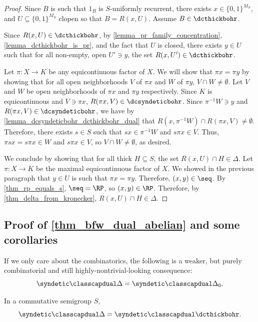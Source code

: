 \begin{proof}
    Since $B$ is such that $1_B$ is $S$-uniformly recurrent, there exists $x \in \{0,1\}^{M_S}$, and $U \subseteq \{0,1\}^{M_S}$ clopen so that $B = R(x,U)$.  Assume $B \in \dcthickbohr$.

    Since $R(x,U) \in \dcthickbohr$, by \cref{lemma_pr_family_concentration}, \cref{lemma_dcthickbohr_is_pr}, and the fact that $U$ is closed, there exists $y \in U$ such that for all non-empty, open $U' \ni y$, the set $R(x,U') \in \dcthickbohr$.
    
    Let $\pi: X \to K$ be any equicontinuous factor of $X$.  We will show that $\pi x = \pi y$ by showing that for all open neighborhoods $V$ of $\pi x$ and $W$ of $\pi y$, $V \cap W \neq \emptyset$.  Let $V$ and $W$ be open neighborhoods of $\pi x$ and $\pi y$ respectively.  Since $K$ is equicontinuous and $V \ni \pi x$, $R(\pi x, V) \in \dcsyndeticbohr$. Since $\pi^{-1} W \ni y$ and $R(\pi x, V) \in \dcsyndeticbohr$, we have by \cref{lemma_dcsyndeticbohr_dcthickbohr_dual} that $R(x,\pi^{-1} W) \cap R(\pi x, V) \neq \emptyset$.  Therefore, there exists $s \in S$ such that $sx \in \pi^{-1} W$ and $s \pi x \in V$.  Thus, $\pi s x = s \pi x \in W$ and $s \pi x \in V$, so $V \cap W \neq \emptyset$, as desired.

    We conclude by showing that for all thick $H \subseteq S$, the set $R(x,U) \cap H \in \Delta$. Let $\pi: X \to K$ be the maximal equicontinuous factor of $X$.  We showed in the previous paragraph that $y \in U$ is such that $\pi x = \pi y$.  Therefore, $(x,y) \in \seq$.  By \cref{thm_rp_equals_s}, $\seq = \RP$, so $(x,y) \in \RP$.  Therefore, by \cref{thm_delta_from_kronecker}, $R(x,U) \cap H \in \Delta$.
\end{proof}


\subsection{Proof of \cref{thm_bfw_dual_abelian} and some corollaries}

If we only care about the combinatorics, the following is a weaker, but purely combinatorial and still highly-nontrivial-looking consequence:
\[\syndetic \classcapdual \Delta = \syndetic \classcapdual \Delta_0.\]

\begin{theorem}
\label{thm_bfw_dual_abelian}
    In a commutative semigroup $S$,
    \[\syndetic \classcapdual \Delta = \syndetic \classcapdual \dcthickbohr.\]
\end{theorem}

